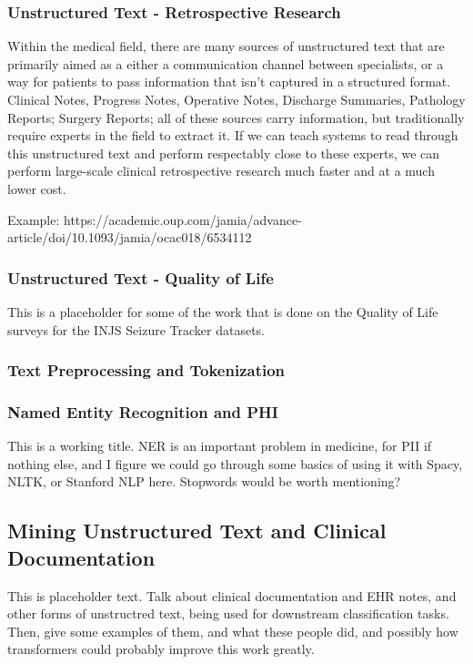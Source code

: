 \subsubsection{Unstructured Text - Retrospective Research}
Within the medical field, there are many sources of unstructured text that are primarily aimed as a either a communication channel between specialists,
or a way for patients to pass information that isn't captured in a structured format.
Clinical Notes, Progress Notes, Operative Notes, Discharge Summaries, Pathology Reports; Surgery Reports; all of these sources carry information, but
traditionally require experts in the field to extract it. If we can teach systems to read through this unstructured text and perform respectably close
to these experts, we can perform large-scale clinical retrospective research much faster and at a much lower cost.

Example:
https://academic.oup.com/jamia/advance-article/doi/10.1093/jamia/ocac018/6534112

\subsubsection{Unstructured Text - Quality of Life}
This is a placeholder for some of the work that is done on the Quality of Life surveys for the INJS Seizure Tracker datasets.

\subsubsection{Text Preprocessing and Tokenization}

\subsubsection{Named Entity Recognition and PHI}

This is a working title. NER is an important problem in medicine, for PII if nothing else, and I figure we could go through some basics of using it with Spacy, NLTK, or Stanford NLP here.
Stopwords would be worth mentioning?

\subsection{Mining Unstructured Text and Clinical Documentation}

This is placeholder text. Talk about clinical documentation and EHR notes, and other forms of unstructred text, being used for downstream classification tasks.
Then, give some examples of them, and what these people did, and possibly how transformers could probably improve this work greatly.

